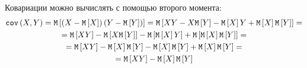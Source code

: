 \begin{enumerate}
    Ковариации можно вычислять с помощью второго момента:
    \begin{multline}
        \covariance{X}{Y}
        = \expectation{\left ( X - \expectation{X} \right ) \left ( Y - \expectation{Y} \right )}
        = \expectation{X Y - X \expectation{Y} - \expectation{X} Y + \expectation{X} \expectation{Y}} = \\
%
        = \expectation{X Y} - \expectation{X \expectation{Y}} - \expectation{\expectation{X} Y} + \expectation{\expectation{X} \expectation{Y}} = \\
%
        = \expectation{X Y} - \expectation{X} \expectation{Y} - \expectation{X} \expectation{Y} + \expectation{X} \expectation{Y} = \\
        = \expectation{X Y} - \expectation{X} \expectation{Y}
    \end{multline}


\end{enumerate}
